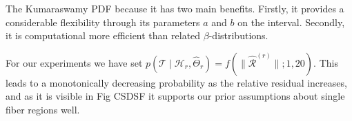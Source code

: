 The Kumaraswamy PDF because it has two main benefits. Firstly, it
provides a considerable flexibility through its parameters $a$ and $b$ on the
interval. Secondly, it is computational more efficient than related
$\beta$-distributions. 

For our experiments we have set $p \left(  \mathcal{T} \mid \mathcal{H}_r,
\hat{\Theta}_r \right) = f \left(  \| \hat{\mathcal{R}}^{\left( r \right)} \| ; 1,20
\right)$. This leads to a monotonically decreasing probability as the relative
residual increases, and as it is visible in Fig CSDSF it supports our prior
assumptions about single fiber regions well.

